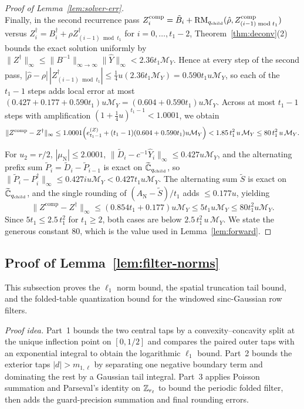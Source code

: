 \begin{proof}[Proof of Lemma~\ref{lem:solver-err}]
\[\]
Finally, in the second recurrence pass $Z^{\mathrm{comp}}_i = \tilde{B}_i + \operatorname{RM}_{q_{\mathrm{child}}}(\hat{\rho}, Z^{\mathrm{comp}}_{(i-1)\bmod t_1})$ versus $Z^\dagger_i = B^\dagger_i + \rho Z^\dagger_{(i-1)\bmod t_1}$ for $i = 0, \dots, t_1 - 2$, Theorem~\ref{thm:deconv}(2) bounds the exact solution uniformly by $\|Z^\dagger\|_\infty \le \|B^{-1}\|_{\infty \to \infty}\|\widehat{Y}\|_\infty < 2.36 t_1 \mathcal{M}_Y$. Hence at every step of the second pass, $|\hat{\rho} - \rho|\,|Z^\dagger_{(i-1)\bmod t_1}| \le \frac{1}{4} u (2.36 t_1 \mathcal{M}_Y) = 0.590 t_1 u \mathcal{M}_Y$, so each of the $t_1 - 1$ steps adds local error at most $(0.427 + 0.177 + 0.590 t_1) u \mathcal{M}_Y = (0.604 + 0.590 t_1) u \mathcal{M}_Y$. Across at most $t_1 - 1$ steps with amplification $(1 + \frac{1}{4}u)^{t_1-1} < 1.0001$, we obtain
\[
  \|Z^{\mathrm{comp}} - Z^\dagger\|_\infty \le 1.0001\Bigl(e_{t_1-1}^{(Z)} + (t_1 - 1)(0.604 + 0.590 t_1) u \mathcal{M}_Y\Bigr) < 1.85 \, t_1^2 \, u \, \mathcal{M}_Y \le 80 \, t_1^2 \, u \, \mathcal{M}_Y.
\]

For $u_2 = r/2$, $|\mu_{\mathrm{N}}| \le 2.0001$, $\|\tilde{D}_i - c^{-1}\widehat{Y}_i\|_\infty \le 0.427 u \mathcal{M}_Y$, and the alternating prefix sum $\tilde{P}_i = \tilde{D}_i - \tilde{P}_{i-1}$ is exact on $\widetilde{\mathbb{C}}_{q_{\mathrm{child}}}$, so $\|\tilde{P}_i - P^\dagger_i\|_\infty \le 0.427 i u \mathcal{M}_Y < 0.427 t_1 u \mathcal{M}_Y$. The alternating sum $\tilde{S}$ is exact on $\widetilde{\mathbb{C}}_{q_{\mathrm{child}}}$, and the single rounding of $(A_{\mathrm{N}} - \tilde{S})/t_1$ adds $\le 0.177 u$, yielding
\[
  \|Z^{\mathrm{comp}} - Z^\dagger\|_\infty \le (0.854 t_1 + 0.177) u \mathcal{M}_Y \le 5 t_1 u \mathcal{M}_Y \le 80 t_1^2 u \mathcal{M}_Y.
\]
Since $5t_1 \le 2.5\,t_1^2$ for $t_1 \ge 2$, both cases are below $2.5\,t_1^2\,u\,\mathcal{M}_Y$. We state the generous constant $80$, which is the value used in Lemma~\ref{lem:forward}.
\end{proof}

\subsection{Proof of Lemma~\ref{lem:filter-norms}}\label{app:filter-norms-proof}

This subsection proves the $\ell_1$ norm bound, the spatial truncation tail bound, and the folded-table quantization bound for the windowed sinc-Gaussian row filters.

\medskip\noindent\emph{Proof idea.} Part~1 bounds the two central taps by a convexity--concavity split at the unique inflection point on $[0, 1/2]$ and compares the paired outer taps with an exponential integral to obtain the logarithmic $\ell_1$ bound. Part~2 bounds the exterior taps $|d| > m_{1,\ell}$ by separating one negative boundary term and dominating the rest by a Gaussian tail integral. Part~3 applies Poisson summation and Parseval's identity on $\mathbb{Z}_{r_\ell}$ to bound the periodic folded filter, then adds the guard-precision summation and final rounding errors.

